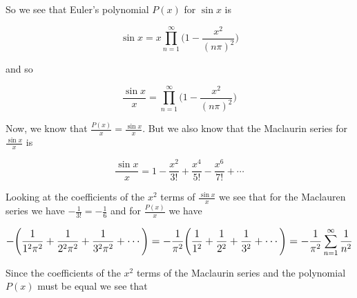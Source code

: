 \documentclass[11pt, oneside]{article}   	%
\begin{document}
\bigskip
\noindent
So we see that Euler's polynomial $P(x)$ for $\sin x$ is 

\bigskip
\begin{equation}
\sin x = x \prod\limits_{n=1}^\infty \Bigg (1 - \frac{x^2}{(n\pi)^2} \Bigg )
\label{eqn:sine}
\end{equation}

\bigskip
\noindent
and so

\begin{equation*}
\frac{\sin x}{x} = \prod\limits_{n=1}^\infty \Bigg (1 - \frac{x^2}{(n\pi)^2} \Bigg )
\end{equation*}

\bigskip
\noindent
Now, we know that $\frac{P(x)}{x} = \frac{\sin x}{x}$. But we also know that the Maclaurin series for $\frac{\sin x}{x}$ is  

\bigskip
\begin{equation*}
\frac{\sin x }{x}= 1 - \frac{x^2}{3!} + \frac{x^4}{5!} - \frac{x^6}{7!} + \cdots
\end{equation*}


% 
% 
% 

\bigskip
\noindent
Looking at the coefficients of the $x^2$ terms of
$\frac{\sin x}{x}$ we see that for the Maclauren series we have
$- \frac{1}{3!} = - \frac{1}{6}$ and for $\frac{P(x)}{x}$ we have

\bigskip
\begin{equation*}
\mathlarger{ - \bigg (\frac{1}{1^2 \pi^2} +  \frac{1}{2^2 \pi^2} +  \frac{1}{3^2 \pi^2} + \cdots \bigg ) 
= - \frac{1}{\pi^2} \bigg (\frac{1}{1^2} +  \frac{1}{2^2 } +  \frac{1}{3^2} + \cdots \bigg ) 
= - \frac{1}{\pi^2} \sum\limits_{n = 1}^\infty \frac{1}{n^2}}
\end{equation*}

\bigskip
\noindent
Since the coefficients of the $x^2$ terms of the Maclaurin series
and the polynomial $P(x)$ must be equal we see that
\end{document}
